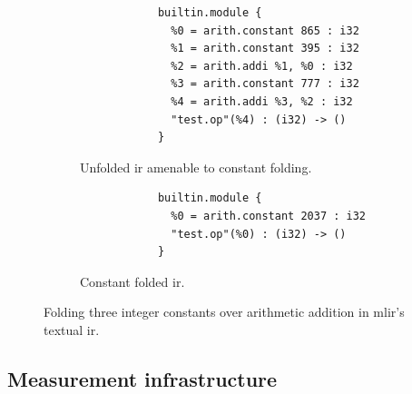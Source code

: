 
\begin{figure}[H]
    \centering
    \begin{subfigure}[b]{0.45\textwidth}
       \centering
        \begin{verbatim}
            builtin.module {
              %0 = arith.constant 865 : i32
              %1 = arith.constant 395 : i32
              %2 = arith.addi %1, %0 : i32
              %3 = arith.constant 777 : i32
              %4 = arith.addi %3, %2 : i32
              "test.op"(%4) : (i32) -> ()
            }
        \end{verbatim}
        \label{listing:constant-folding-workload-initial}
        \caption{Unfolded \ac{ir} amenable to constant folding.}
    \end{subfigure}
    \hfill
    \begin{subfigure}[b]{0.45\textwidth}
        \centering
        \begin{verbatim}
            builtin.module {
              %0 = arith.constant 2037 : i32
              "test.op"(%0) : (i32) -> ()
            }
        \end{verbatim}
        \footnotesize\vspace{2.5em}
        \caption{Constant folded \ac{ir}.}
        \label{listing:constant-folding-workload-folded}
    \end{subfigure}
    \vspace{1em}
    \captionsetup{name=Listing}
    \caption{Folding three integer constants over arithmetic addition in \ac{mlir}'s textual \ac{ir}.}
    \label{listing:constant-folding-workload-example}
\end{figure}

\vspace{2em}


\subsection{Measurement infrastructure}
\label{ssec:infrastructure}

